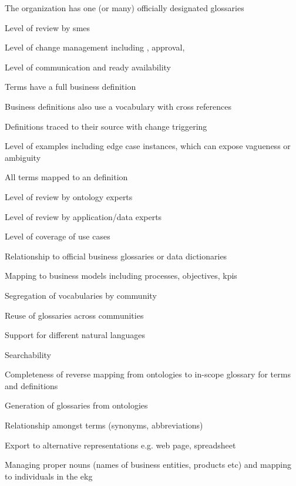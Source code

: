 %
%



\begin{maturity-dimensions}

  \item The organization has one (or many) officially designated glossaries
  \item Level of review by \glspl{sme}
  \item Level of change management including , approval, 
  \item Level of communication and ready availability
  \item Terms have a full business definition
  \item Business definitions also use a vocabulary with cross references
  \item Definitions traced to their source with change triggering
  \item Level of examples including edge case instances, which can expose vagueness or ambiguity
  \item All terms mapped to an  definition
  \item Level of review by ontology experts
  \item Level of review by application/data experts
  \item Level of coverage of use cases
  \item Relationship to official business glossaries or data dictionaries
  \item Mapping to business models including processes, objectives, \glspl{kpi}
  \item Segregation of vocabularies by community
  \item Reuse of glossaries across communities
  \item Support for different natural languages
  \item Searchability
  \item Completeness of reverse mapping from ontologies to in-scope glossary for terms and definitions
  \item Generation of glossaries from ontologies
  \item Relationship amongst terms (synonyms, abbreviations)
  \item Export to alternative representations e.g. web page, spreadsheet
  \item Managing proper nouns (names of business entities, products etc) and mapping to individuals in the \gls{ekg}
  
\end{maturity-dimensions}

